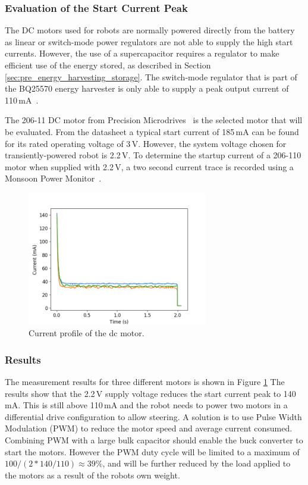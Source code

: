 \subsubsection{Evaluation of the Start Current Peak}
The DC motors used for robots are normally powered directly from the battery as linear or switch-mode power regulators are not able to supply the high start currents.
However, the use of a supercapacitor requires a regulator to make efficient use of the energy stored, as described in Section \ref{sec:pre_energy_harvesting_storage}.
The switch-mode regulator that is part of the BQ25570 energy harvester is only able to supply a peak output current of 110\,mA~\cite{bq25570_2017}.

The 206-11 DC motor from Precision Microdrives~\cite{gearmotor_206-110_2017} is the selected motor that will be evaluated.
From the datasheet a typical start current of 185\,mA can be found for its rated operating voltage of 3\,V.
However, the system voltage chosen for transiently-powered robot is 2.2\,V.
To determine the startup current of a 206-110 motor when supplied with 2.2\,V, a two second current trace is recorded using a Monsoon Power Monitor~\cite{monsoon_powermonitor_2017}.


\begin{figure}%
	\centering
	\includegraphics[width=0.7\textwidth]{pics/free_running_current.png}
	\caption{Current profile of the dc motor.}
	\label{fig:free_running_current}
\end{figure}

\subsubsection{Results}
The measurement results for three different motors is shown in Figure \ref{fig:free_running_current}
The results show that the 2.2\,V supply voltage reduces the start current peak to 140\,mA.
This is still above 110\,mA and the robot needs to power two motors in a differential drive configuration to allow steering.
A solution is to use Pulse Width Modulation (PWM) to reduce the motor speed and average current consumed.
Combining PWM with a large bulk capacitor should enable the buck converter to start the motors.
However the PWM duty cycle will be limited to a maximum of $100/(2*140/110) \approx 39\%$, and will be further reduced by the load applied to the motors as a result of the robots own weight.


